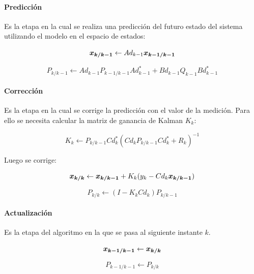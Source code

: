 			\paragraph{Predicción}
				Es la etapa en la cual se realiza una predicción del futuro estado del sistema utilizando el modelo en el espacio de estados:
				
				\begin{equation*}
					\boldsymbol{x_{k/k - 1}} \leftarrow Ad_{k - 1} \boldsymbol{x_{k - 1/k - 1}}
				\end{equation*}
				
				\begin{equation*}
					P_{k/k - 1} \leftarrow Ad_{k - 1} P_{k - 1 / k - 1} Ad_{k - 1}^{*} + Bd_{k - 1} Q_{k - 1} Bd_{k - 1}^{*}
				\end{equation*}
			\paragraph{Corrección}
				Es la etapa en la cual se corrige la predicción con el valor de la medición. Para ello se necesita calcular la matriz de ganancia de Kalman $K_{k}$:
				
				\begin{equation*}
					K_{k} \leftarrow P_{k / k - 1} Cd_{k}^{*} (Cd_{k} P_{k/k - 1} Cd_{k}^{*} + R_{k})^{-1}
				\end{equation*}
				
				Luego se corrige:
				
				\begin{equation*}
					\boldsymbol{x_{k/k}} \leftarrow \boldsymbol{x_{k/k - 1}} + K_{k} (y_{k} - Cd_{k} \boldsymbol{x_{k/k - 1}})
				\end{equation*}
				
				\begin{equation*}
					P_{k/k} \leftarrow (I - K_{k} Cd_{k}) P_{k/k - 1}
				\end{equation*}
					
			\paragraph{Actualización}
				Es la etapa del algoritmo en la que se pasa al siguiente instante $k$.
				
				\begin{equation*}
					\boldsymbol{x_{k - 1/k - 1}} \leftarrow \boldsymbol{x_{k/k}}
				\end{equation*}
				
				\begin{equation*}
					P_{k - 1/k - 1} \leftarrow P_{k/k}
				\end{equation*}


